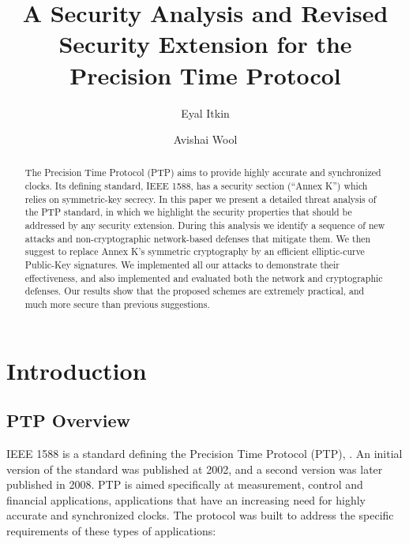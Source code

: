 \documentclass[11pt]{article}
\begin{document}
\title{A Security Analysis and Revised Security Extension for the Precision Time Protocol}

\author{Eyal Itkin}
\author{Avishai Wool}


\renewcommand\Affilfont{\itshape\small}

\maketitle


\begin{abstract}

The Precision Time Protocol (PTP) aims to provide highly accurate and synchronized clocks. Its defining standard, IEEE 1588, has a security section (``Annex K'') which relies on symmetric-key secrecy. In this paper we present a detailed threat analysis of the PTP standard, in which we highlight the security properties that should be addressed by any security extension. During this analysis we identify a sequence of new attacks and non-cryptographic network-based defenses that mitigate them. We then suggest to replace Annex K's symmetric cryptography by an efficient elliptic-curve Public-Key signatures. We implemented all our attacks to demonstrate their effectiveness, and also implemented and evaluated both the network and cryptographic defenses. Our results show that the proposed schemes are extremely practical, and much more secure than previous suggestions.



\end{abstract}







\section{Introduction}\label{Introduction}



\subsection{PTP Overview}\label{PTP}

IEEE 1588 is a standard defining the Precision Time Protocol (PTP), \cite{standard}. An initial version of the standard was published at 2002, and a second version was later published in 2008. PTP is aimed specifically at measurement, control and financial applications, applications that have an increasing need for highly accurate and synchronized clocks. The protocol was built to address the specific requirements of these types of applications:
\end{document}
